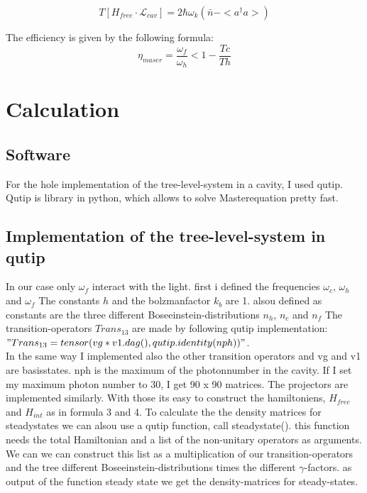 \documentclass[12pt,a4paper]{article}
\begin{document}
\begin{equation}
T[H_{free}\cdot \mathcal{L}_{cav}]=2\hbar \omega_k (\bar{n}-<a^{\dag{}}a>)
\end{equation}

The efficiency is given by the following formula:
\begin{equation}
\eta_{maser}=\frac{\omega_f}{\omega_h}<1-\frac{Tc}{Th}
\end{equation}

\section{Calculation}
\subsection{Software}
For the hole implementation of the tree-level-system in a cavity, I used qutip. Qutip is library in python, which allows to solve Masterequation pretty fast.
\subsection{Implementation of the tree-level-system in qutip}
In our case only $\omega_f$ interact with the light. 
first i defined the frequencies $ \omega_c $, $ \omega_h$ and $ \omega_f$ 
The constants $h $ and the bolzmanfactor $k_b$ are 1.
alsou defined as constants are the three different Boseeinstein-distributions $n_h$, $n_c$ and $n_f$
The transition-operators $Trans_{13} $ are  made by following qutip implementation:\\ $"Trans_{13}=tensor(vg*v1.dag(),qutip.identity(nph))"$.\\
In the same way I implemented also the other transition operators and 
vg and v1 are basisstates.  nph is the maximum of the photonnumber in the cavity. If I set my maximum photon number to 30, I get 90 x 90 matrices. 
The projectors are implemented similarly. 
With those its easy to construct the hamiltoniens, $H_{free}$ and $H_{int}$ as in formula 3 and 4.
To calculate the the density matrices for steadystates we can alsou use a qutip function, call steadystate().
this function needs the total Hamiltonian and a list of the non-unitary operators as arguments.
We can we can construct this list as a multiplication of our transition-operators and the tree different Boseeinstein-distributions times the different $\gamma$-factors. 
as output of the function steady state we get the density-matrices for steady-states.
\end{document}
